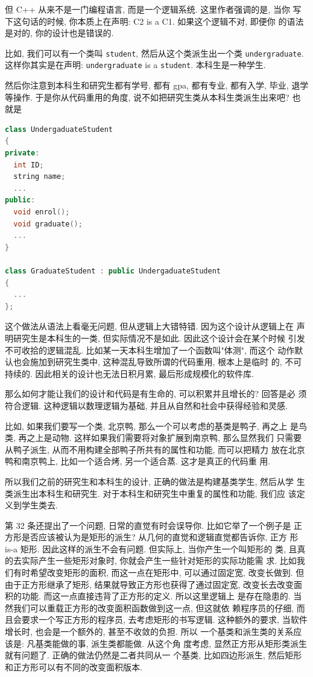 \documentclass[a4paper]{ctexart}
\theoremstyle{definition}
\theoremstyle{definition}
\begin{document}
但 C++ 从来不是一门编程语言, 而是一个逻辑系统. 这里作者强调的是, 当你
写下这句话的时候, 你本质上在声明: C2 is a C1. 如果这个逻辑不对, 即便你
的语法是对的, 你的设计也是错误的.

比如, 我们可以有一个类叫 \verb|student|, 然后从这个类派生出一个类
\verb|undergraduate|. 这样你其实是在声明: \verb|undergraduate| is a
\verb|student|. 本科生是一种学生.

然后你注意到本科生和研究生都有学号, 都有 gpa, 都有专业, 都有入学, 毕业,
退学等操作. 于是你从代码重用的角度, 说不如把研究生类从本科生类派生出来吧? 也就是

\begin{lstlisting}[language=C++]
class UndergaduateStudent
{
private:
  int ID;
  string name;
  ...
public:
  void enrol();
  void graduate();
  ...
} 
  
class GraduateStudent : public UndergaduateStudent
{
  ...
};
\end{lstlisting}

这个做法从语法上看毫无问题, 但从逻辑上大错特错. 因为这个设计从逻辑上在
声明研究生是本科生的一类, 但实际情况不是如此. 因此这个设计会在某个时候
引发不可收拾的逻辑混乱. 比如某一天本科生增加了一个函数叫"体测", 而这个
动作默认也会施加到研究生类中, 这种混乱导致所谓的代码重用, 根本上是临时
的, 不可持续的. 因此相关的设计也无法日积月累, 最后形成规模化的软件库.

那么如何才能让我们的设计和代码是有生命的, 可以积累并且增长的? 回答是必
须符合逻辑. 这种逻辑以数理逻辑为基础, 并且从自然和社会中获得经验和灵感.

比如, 如果我们要写一个类, 北京鸭, 那么一个可以考虑的基类是鸭子, 再之上
是鸟类, 再之上是动物. 这样如果我们需要将对象扩展到南京鸭, 那么显然我们
只需要从鸭子派生, 从而不用构建全部鸭子所共有的属性和功能, 而可以把精力
放在北京鸭和南京鸭上, 比如一个适合烤, 另一个适合蒸. 这才是真正的代码重
用.

所以我们之前的研究生和本科生的设计, 正确的做法是构建基类学生, 然后从学
生类派生出本科生和研究生. 对于本科生和研究生中重复的属性和功能, 我们应
该定义到学生类去.

第 32 条还提出了一个问题, 日常的直觉有时会误导你. 比如它举了一个例子是
正方形是否应该被认为是矩形的派生? 从几何的直觉和逻辑直觉都告诉你, 正方
形 is-a 矩形. 因此这样的派生不会有问题. 但实际上, 当你产生一个叫矩形的
类, 且真的去实际产生一些矩形对象时, 你就会产生一些针对矩形的实际功能需
求. 比如我们有时希望改变矩形的面积, 而这一点在矩形中, 可以通过固定宽,
改变长做到. 但由于正方形继承了矩形, 结果就导致正方形也获得了通过固定宽,
改变长去改变面积的功能. 而这一点直接违背了正方形的定义. 所以这里逻辑上
是存在隐患的. 当然我们可以重载正方形的改变面积函数做到这一点, 但这就依
赖程序员的仔细, 而且会要求一个写正方形的程序员, 去考虑矩形的书写逻辑.
这种额外的要求, 当软件增长时, 也会是一个额外的, 甚至不收敛的负担. 所以
一个基类和派生类的关系应该是: 凡基类能做的事, 派生类都能做.  从这个角
度考虑, 显然正方形从矩形类派生就有问题了. 正确的做法仍然是二者共同从一
个基类, 比如四边形派生, 然后矩形和正方形可以有不同的改变面积版本.
\end{document}
